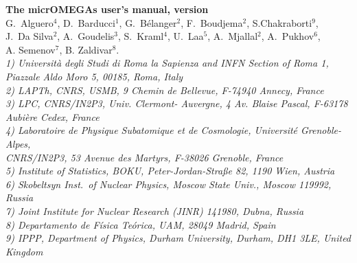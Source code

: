 \documentclass[12pt,a4paper]{article}
\begin{document}
\begin{center}


{\Large\bf The micrOMEGAs  user's manual, version \VERSION} \\[8mm]

{\large   G.~Alguero$^{4}$, D.~Barducci$^{1}$, G.~B\'elanger$^2$,  F.~Boudjema$^2$, S.Chakraborti$^9$,\\[2mm]  J.~Da Silva$^{2}$, A.~Goudelis$^{3}$, S.~Kraml$^{4}$, U.~Laa$^{5}$, A.~Mjallal$^{2}$, 
A.~Pukhov$^6$,  \\[2mm]A. Semenov$^7$, B. Zaldivar$^{8}$.}\\[4mm]

{\it 
1) Universit\`a degli Studi di Roma la Sapienza and INFN Section of Roma 1,\\ Piazzale Aldo Moro 5, 00185, Roma, Italy\\
2) LAPTh, CNRS, USMB, 9 Chemin de Bellevue,  F-74940 Annecy, France\\
3) LPC, CNRS/IN2P3, Univ.  Clermont- Auvergne, 4 Av. Blaise Pascal, F-63178 Aubi\`ere Cedex,  France\\
4) {Laboratoire de Physique Subatomique et de Cosmologie}, Universit\'e Grenoble-Alpes,\\ CNRS/IN2P3, 53 Avenue des Martyrs, F-38026 Grenoble,  France\\
5) Institute of Statistics, BOKU, Peter-Jordan-Straße 82, 1190 Wien, Austria\\
6) Skobeltsyn Inst.\ of Nuclear Physics, Moscow State Univ., Moscow 119992, Russia\\
7) Joint Institute for Nuclear Research (JINR) 141980, Dubna,  Russia\\
8) Departamento de F\'isica Te\'orica, UAM, 28049 Madrid, Spain \\
9) IPPP, Department of Physics, Durham University, Durham, DH1 3LE,  United Kingdom}


\end{center}

\begin{abstract}
We give an up-to-date description of the \micro\ functions. Only the routines which are available for
the users are described.  Examples on how to use these functions
can be found in the sample main programs distributed with the code. 
\end{abstract}
\end{document}
